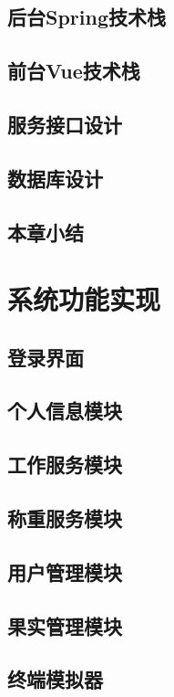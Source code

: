 \documentclass{xduugthesis}
\begin{document}
\section{后台Spring技术栈}

\section{前台Vue技术栈}

\section{服务接口设计}

\section{数据库设计}

\section{本章小结}


\chapter{系统功能实现}
\section{登录界面}
\section{个人信息模块}
\section{工作服务模块}
\section{称重服务模块}
\section{用户管理模块}
\section{果实管理模块}
\section{终端模拟器}
\end{document}
